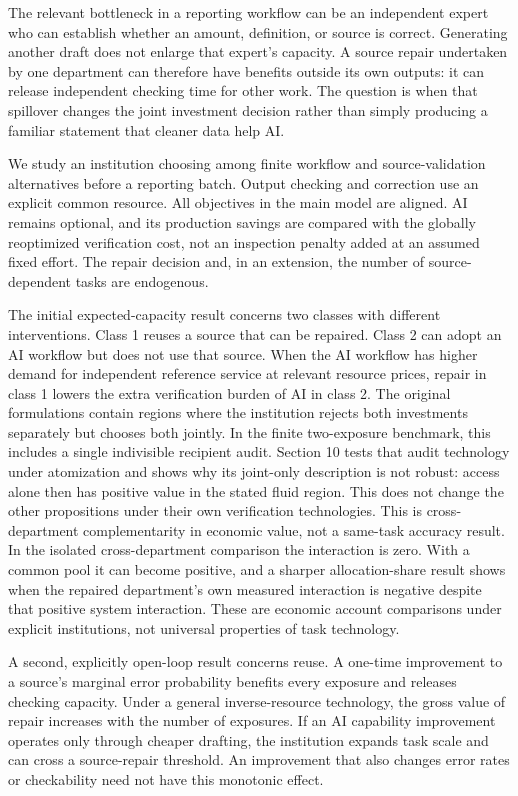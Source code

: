 \documentclass[
  11pt,
  a4paper,
]{article}
\begin{document}
The relevant bottleneck in a reporting workflow can be an independent
expert who can establish whether an amount, definition, or source is
correct. Generating another draft does not enlarge that expert's
capacity. A source repair undertaken by one department can therefore
have benefits outside its own outputs: it can release independent
checking time for other work. The question is when that spillover
changes the joint investment decision rather than simply producing a
familiar statement that cleaner data help AI.

We study an institution choosing among finite workflow and
source-validation alternatives before a reporting batch. Output checking
and correction use an explicit common resource. All objectives in the
main model are aligned. AI remains optional, and its production savings
are compared with the globally reoptimized verification cost, not an
inspection penalty added at an assumed fixed effort. The repair decision
and, in an extension, the number of source-dependent tasks are
endogenous.

The initial expected-capacity result concerns two classes with different
interventions. Class 1 reuses a source that can be repaired. Class 2 can
adopt an AI workflow but does not use that source. When the AI workflow
has higher demand for independent reference service at relevant resource
prices, repair in class 1 lowers the extra verification burden of AI in
class 2. The original formulations contain regions where the institution
rejects both investments separately but chooses both jointly. In the
finite two-exposure benchmark, this includes a single indivisible
recipient audit. Section 10 tests that audit technology under
atomization and shows why its joint-only description is not robust:
access alone then has positive value in the stated fluid region. This
does not change the other propositions under their own verification
technologies. This is cross-department complementarity in economic
value, not a same-task accuracy result. In the isolated cross-department
comparison the interaction is zero. With a common pool it can become
positive, and a sharper allocation-share result shows when the repaired
department's own measured interaction is negative despite that positive
system interaction. These are economic account comparisons under
explicit institutions, not universal properties of task technology.

A second, explicitly open-loop result concerns reuse. A one-time
improvement to a source's marginal error probability benefits every
exposure and releases checking capacity. Under a general
inverse-resource technology, the gross value of repair increases with
the number of exposures. If an AI capability improvement operates only
through cheaper drafting, the institution expands task scale and can
cross a source-repair threshold. An improvement that also changes error
rates or checkability need not have this monotonic effect.
\end{document}
